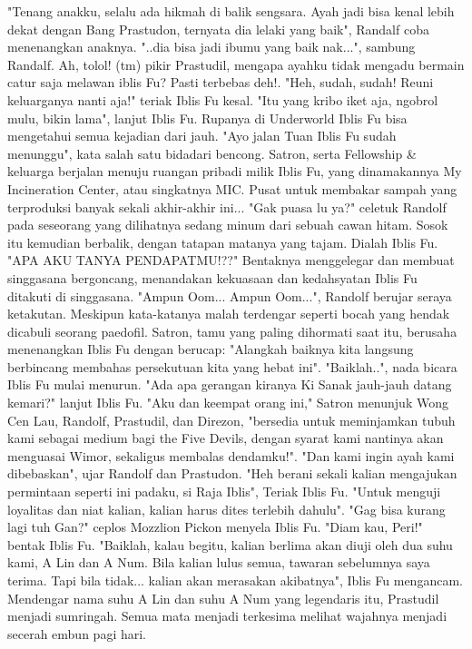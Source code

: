 \documentclass[a4paper,11pt,final]{article}
\begin{document}
"Tenang anakku, selalu ada hikmah di balik sengsara. Ayah jadi bisa kenal lebih dekat dengan Bang Prastudon, ternyata dia lelaki yang baik", Randalf coba menenangkan anaknya.
"..dia bisa jadi ibumu yang baik nak...", sambung Randalf.
Ah, tolol! (tm) pikir Prastudil, mengapa ayahku tidak mengadu bermain catur saja melawan iblis Fu? Pasti terbebas deh!.
"Heh, sudah, sudah! Reuni keluarganya nanti aja!" teriak Iblis Fu kesal.
"Itu yang kribo iket aja, ngobrol mulu, bikin lama", lanjut Iblis Fu. Rupanya di Underworld Iblis Fu bisa mengetahui semua kejadian dari jauh. "Ayo jalan Tuan Iblis Fu sudah menunggu", kata salah satu bidadari bencong.
Satron, serta Fellowship \& keluarga berjalan menuju ruangan pribadi milik Iblis Fu, yang dinamakannya My Incineration Center, atau singkatnya MIC. Pusat untuk membakar sampah yang terproduksi banyak sekali akhir-akhir ini...
"Gak puasa lu ya?" celetuk Randolf pada seseorang yang dilihatnya sedang minum dari sebuah cawan hitam. Sosok itu kemudian berbalik, dengan tatapan matanya yang tajam. Dialah Iblis Fu.
"APA AKU TANYA PENDAPATMU!??" Bentaknya menggelegar dan membuat singgasana bergoncang, menandakan kekuasaan dan kedahsyatan Iblis Fu ditakuti di singgasana.
"Ampun Oom... Ampun Oom...", Randolf berujar seraya ketakutan. Meskipun kata-katanya malah terdengar seperti bocah yang hendak dicabuli seorang paedofil.
Satron, tamu yang paling dihormati saat itu, berusaha menenangkan Iblis Fu dengan berucap: "Alangkah baiknya kita langsung berbincang membahas persekutuan kita yang hebat ini".
"Baiklah..", nada bicara Iblis Fu mulai menurun. "Ada apa gerangan kiranya Ki Sanak jauh-jauh datang kemari?" lanjut Iblis Fu.
"Aku dan keempat orang ini," Satron menunjuk Wong Cen Lau, Randolf, Prastudil, dan Direzon, "bersedia untuk meminjamkan tubuh kami sebagai medium bagi the Five Devils, dengan syarat kami nantinya akan menguasai Wimor, sekaligus membalas dendamku!".
"Dan kami ingin ayah kami dibebaskan", ujar Randolf dan Prastudon. "Heh berani sekali kalian mengajukan permintaan seperti ini padaku, si Raja Iblis", Teriak Iblis Fu. "Untuk menguji loyalitas dan niat kalian, kalian harus dites terlebih dahulu".
"Gag bisa kurang lagi tuh Gan?" ceplos Mozzlion Pickon menyela Iblis Fu.
"Diam kau, Peri!" bentak Iblis Fu. "Baiklah, kalau begitu, kalian berlima akan diuji oleh dua suhu kami, A Lin dan A Num. Bila kalian lulus semua, tawaran sebelumnya saya terima. Tapi bila tidak... kalian akan merasakan akibatnya", Iblis Fu mengancam.
Mendengar nama suhu A Lin dan suhu A Num yang legendaris itu, Prastudil menjadi sumringah. Semua mata menjadi terkesima melihat wajahnya menjadi secerah embun pagi hari.
\end{document}
